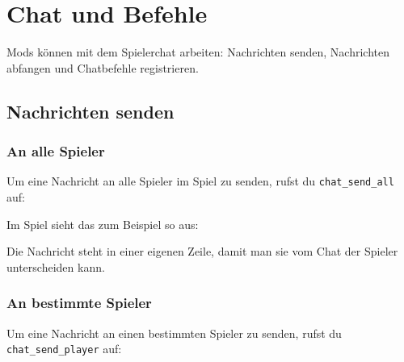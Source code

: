 \chapter{Chat und Befehle}
\label{ch:players/chat}

Mods können mit dem Spielerchat arbeiten: Nachrichten senden,
Nachrichten abfangen und Chatbefehle
registrieren.

\section{Nachrichten senden}\label{nachrichten-senden}

\subsection{An alle Spieler}\label{an-alle-spieler}

Um eine Nachricht an alle Spieler im Spiel zu senden, rufst du
\texttt{chat\_\allowbreak{}send\_\allowbreak{}all} auf:

\begin{Shaded}
\begin{Highlighting}[]
\OperatorTok{(}
\OperatorTok{)}
\end{Highlighting}
\end{Shaded}

Im Spiel sieht das zum Beispiel so aus:

\begin{Shaded}
\begin{Highlighting}[]
\end{Highlighting}
\end{Shaded}

Die Nachricht steht in einer eigenen Zeile, damit man sie vom Chat der
Spieler unterscheiden kann.

\subsection{An bestimmte Spieler}\label{an-bestimmte-spieler}

Um eine Nachricht an einen bestimmten Spieler zu senden, rufst du
\texttt{chat\_\allowbreak{}send\_\allowbreak{}player} auf:

